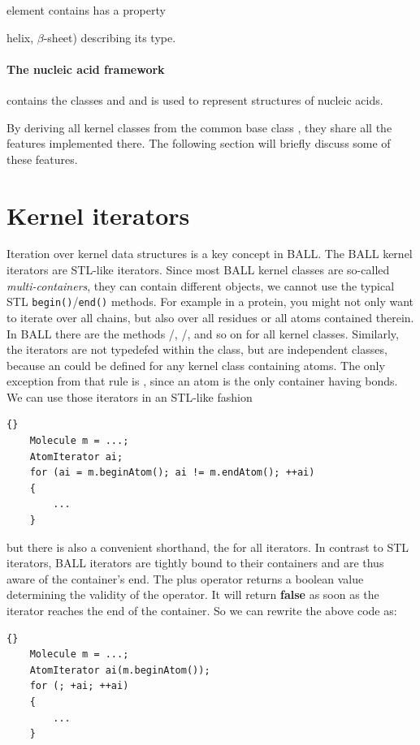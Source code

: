 element contains has a property {\eg helix, $\beta$-sheet) describing its type.

\paragraph{The nucleic acid framework} contains the classes 
and  and is used to represent structures of nucleic acids.

By deriving all kernel classes from the common base class ,
they share all the features implemented there. The following section will
briefly discuss some of these features.

\section{Kernel iterators}
Iteration over kernel data structures is a key concept in BALL.
The BALL kernel iterators are STL-like iterators. Since most BALL kernel
classes are so-called {\em multi-containers}, \ie they can contain different
objects, we cannot use the typical STL {\tt begin()}/{\tt end()} methods.
For example in a protein, you might not only want to iterate over all chains,
but also over all residues or all atoms contained therein. In BALL there
are the methods /,
/, and so on for all
kernel classes. Similarly, the iterators are not typedefed within the class,
but are independent classes, because an  could be defined
for any kernel class containing atoms. The only exception from that rule
is , since an atom is the only container having
bonds. We can use those iterators in an STL-like fashion
\\
\begin{lstlisting}{}
	Molecule m = ...;
	AtomIterator ai;
	for (ai = m.beginAtom(); ai != m.endAtom(); ++ai)
	{
		...
	}
\end{lstlisting}
\noindent but there is also a convenient shorthand, the 
for all iterators. In contrast to STL iterators, BALL iterators are tightly 
bound to their containers and are thus aware of the container's end.
The plus operator returns a boolean value determining the validity of the
operator. It will return {\bf false} as soon as the iterator reaches the
end of the container. So we can rewrite the above code as:
\\
\begin{lstlisting}{}
	Molecule m = ...;
	AtomIterator ai(m.beginAtom());
	for (; +ai; ++ai)
	{
		...
	}
\end{lstlisting}

}
